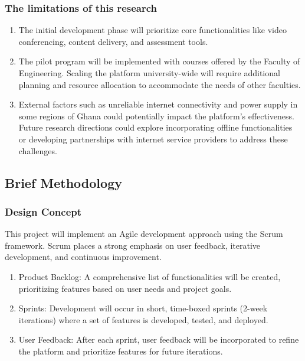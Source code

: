 \documentclass[a4paper,12pt]{article}  %
\begin{document}
\subsubsection{The limitations of this research}
\begin{enumerate}
      \item The initial development phase will prioritize core functionalities like video
            conferencing, content delivery, and assessment tools.
      \item The pilot program will be implemented with courses offered by the Faculty of
            Engineering. Scaling the platform university-wide will require additional
            planning and resource allocation to accommodate the needs of other faculties.
      \item External factors such as unreliable internet connectivity and power supply in
            some regions of Ghana could potentially impact the platform's effectiveness.
            Future research directions could explore incorporating offline functionalities
            or developing partnerships with internet service providers to address these
            challenges.
\end{enumerate}

\subsection{Brief Methodology}
\subsubsection{ Design Concept}
This project will implement an Agile development approach using the Scrum
framework. Scrum places a strong emphasis on user feedback, iterative
development, and continuous improvement.\\

\begin{enumerate}
      \item Product Backlog: A comprehensive list of functionalities will be created,
            prioritizing features based on user needs and project goals.\\
      \item Sprints: Development will occur in short, time-boxed sprints (2-week
            iterations) where a set of features is developed, tested, and deployed.\\
      \item User Feedback: After each sprint, user feedback will be incorporated to refine
            the platform and prioritize features for future iterations.\\
\end{enumerate}
\end{document}
